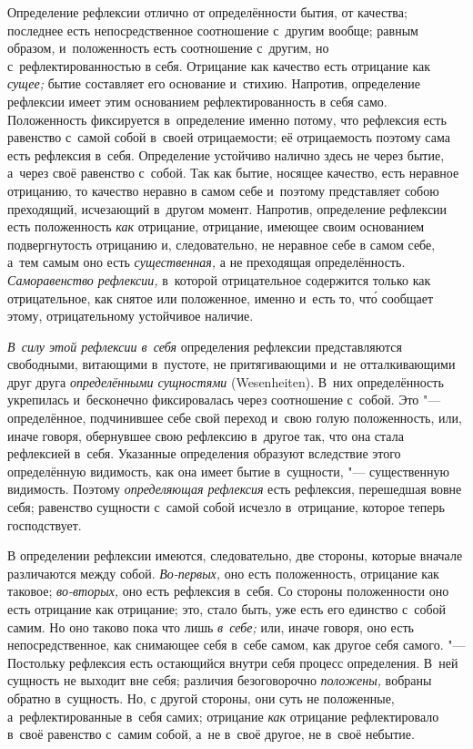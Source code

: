 Определение рефлексии отлично от определённости бытия, от качества;
последнее есть непосредственное соотношение с~другим вообще; равным
образом, и~положенность есть соотношение с~другим, но с~рефлектированностью
в себя. Отрицание как качество есть отрицание как
{\em сущее;} бытие составляет его основание и~стихию.
Напротив, определение рефлексии имеет этим основанием рефлектированность в
себя само. Положенность фиксируется в~определение именно потому, что
рефлексия есть равенство с~самой собой в~своей отрицаемости; её
отрицаемость поэтому сама есть рефлексия в~себя. Определение устойчиво
налично здесь не через бытие, а~через своё равенство с~собой. Так как
бытие, носящее качество, есть неравное отрицанию, то качество неравно в
самом себе и~поэтому представляет собою преходящий, исчезающий в~другом
момент. Напротив, определение рефлексии есть положенность
{\em как} отрицание, отрицание, имеющее своим
основанием подвергнутость отрицанию и, следовательно, не неравное себе в
самом себе, а~тем самым оно есть {\em существенная,} а
не преходящая определённость. {\em Саморавенство
рефлексии,} в~которой отрицательное содержится только как отрицательное,
как снятое или положенное, именно и~есть то, чт\'{о} сообщает этому,
отрицательному устойчивое наличие.

{\em В~силу этой рефлексии в~себя} определения рефлексии
представляются свободными, витающими в~пустоте, не притягивающими и~не
отталкивающими друг друга {\em определёнными сущностями} (Wesenheiten). В~них
определённость укрепилась и~бесконечно
фиксировалась через соотношение с~собой. Это "--- определённое, подчинившее
себе свой переход и~свою голую положенность, или, иначе говоря, обернувшее
свою рефлексию в~другое так, что она стала рефлексией в~себя. Указанные
определения образуют вследствие этого определённую видимость, как она имеет
бытие в~сущности, "--- существенную видимость. Поэтому
{\em определяющая рефлексия} есть рефлексия, перешедшая
вовне себя; равенство сущности с~самой собой исчезло в~отрицание, которое
теперь господствует.

В определении рефлексии имеются, следовательно, две стороны, которые вначале
различаются между собой. {\em Во-первых,} оно есть
положенность, отрицание как таковое; {\em во-вторых,}
оно есть рефлексия в~себя. Со стороны положенности оно есть отрицание как
отрицание; это, стало быть, уже есть его единство с~собой самим. Но оно
таково пока что лишь {\em в~себе;} или, иначе говоря,
оно есть непосредственное, как снимающее себя в~себе самом, как другое себя
самого. "--- Постольку рефлексия есть остающийся внутри себя процесс
определения. В~ней сущность не выходит вне себя; различия безоговорочно
{\em положены,} вобраны обратно в~сущность. Но, с
другой стороны, они суть не положенные, а~рефлектированные в~себя самих;
отрицание {\em как} отрицание рефлектировало в~своё
равенство с~самим собой, а~не в~своё другое, не в~своё небытие.

